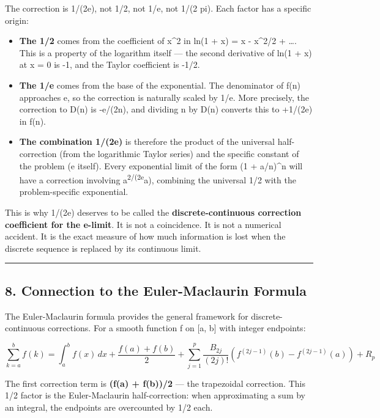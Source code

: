 \documentclass[
]{article}
\begin{document}
The correction is 1/(2e), not 1/2, not 1/e, not 1/(2 pi). Each factor
has a specific origin:

\begin{itemize}
\item
  \textbf{The 1/2} comes from the coefficient of x\^{}2 in ln(1 + x) = x
  - x\^{}2/2 + \ldots. This is a property of the logarithm itself ---
  the second derivative of ln(1 + x) at x = 0 is -1, and the Taylor
  coefficient is -1/2.
\item
  \textbf{The 1/e} comes from the base of the exponential. The
  denominator of f(n) approaches e, so the correction is naturally
  scaled by 1/e. More precisely, the correction to D(n) is -e/(2n), and
  dividing n by D(n) converts this to +1/(2e) in f(n).
\item
  \textbf{The combination 1/(2e)} is therefore the product of the
  universal half-correction (from the logarithmic Taylor series) and the
  specific constant of the problem (e itself). Every exponential limit
  of the form (1 + a/n)\^{}n will have a correction involving
  a\textsuperscript{2/(2e}a), combining the universal 1/2 with the
  problem-specific exponential.
\end{itemize}

This is why 1/(2e) deserves to be called the \textbf{discrete-continuous
correction coefficient for the e-limit}. It is not a coincidence. It is
not a numerical accident. It is the exact measure of how much
information is lost when the discrete sequence is replaced by its
continuous limit.

\begin{center}\rule{0.5\linewidth}{0.5pt}\end{center}

\subsection{8. Connection to the Euler-Maclaurin
Formula}\label{connection-to-the-euler-maclaurin-formula}

The Euler-Maclaurin formula provides the general framework for
discrete-continuous corrections. For a smooth function f on {[}a, b{]}
with integer endpoints:

\[\sum_{k=a}^{b} f(k) = \int_a^b f(x)\,dx + \frac{f(a) + f(b)}{2} + \sum_{j=1}^{p} \frac{B_{2j}}{(2j)!}\left(f^{(2j-1)}(b) - f^{(2j-1)}(a)\right) + R_p\]

The first correction term is \textbf{(f(a) + f(b))/2} --- the
trapezoidal correction. This 1/2 factor is the Euler-Maclaurin
half-correction: when approximating a sum by an integral, the endpoints
are overcounted by 1/2 each.
\end{document}
